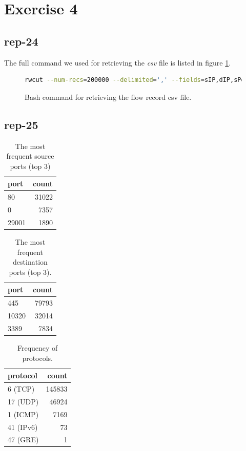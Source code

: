 \section*{Exercise 4}
\subsection*{rep-24}
The full command we used for retrieving the \textit{csv} file is listed in figure \ref{fig:bash-flowrec}.
\begin{figure}[H]
\begin{lstlisting}[language=bash]
rwcut --num-recs=200000 --delimited=',' --fields=sIP,dIP,sPort,dPort,protocol,flags,ttl,bytes team16.flowrecord.rw > team16_flowrecord.csv
\end{lstlisting}
\caption{Bash command for retrieving the flow record csv file.}
\label{fig:bash-flowrec}
\end{figure}
\subsection*{rep-25}
\begin{table}[H]
\center
\begin{tabular}{lr}
\toprule
port & count \\
\midrule
80 & 31022 \\
0 & 7357 \\
29001 & 1890 \\ 
\bottomrule
\end{tabular}
\caption{The most frequent source ports (top 3)}
\label{tab:most-frequent-source-ports}
\end{table}

\begin{table}[H]
\center
\begin{tabular}{lr}
\toprule
port & count \\
\midrule
445 & 79793 \\
10320 & 32014 \\
3389 & 7834 \\
\bottomrule
\end{tabular}
\caption{The most frequent destination ports (top 3).}
\label{tab:most-frequent-destination-ports}
\end{table}

\begin{table}[H]
\center
\begin{tabular}{lr}
\toprule
protocol & count \\
\midrule
6 (TCP) & 145833 \\ 
17 (UDP) & 46924 \\
1 (ICMP) & 7169 \\
41 (IPv6) & 73 \\
47 (GRE) & 1 \\
\bottomrule
\end{tabular}
\caption{Frequency of protocols.}
\label{tab:all-protocols}
\end{table}

